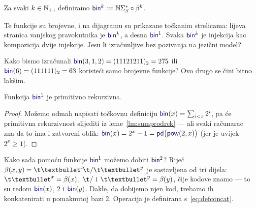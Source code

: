 \begin{definicija}[{name=[binarno kodiranje --- prateća funkcija binarne reprezentacije]}]\label{def:bink}
Za svaki $k\in{\mathbb N}_+$, definiramo $\f{bin}^k:=\N\Sigma_\beta^*\circ\beta^k$.
\end{definicija}

Te funkcije su brojevne, i na dijagramu su prikazane točkanim strelicama: lijeva stranica vanjskog pravokutnika je $\f{bin}^k$, a desna $\f{bin}^1$. Svaka $\f{bin}^k$ je injekcija kao kompozicija dvije injekcije. Jesu li izračunljive bez pozivanja na jezični model? %

Kako bismo izračunali $\f{bin}(3,1,2)=(11121211)_2=275$ ili $\f{bin}(6)=(111111)_2=63$ koristeći samo brojevne funkcije? Ovo drugo se čini bitno lakšim.

\begin{lema}[{name=[primitivna rekurzivnost jednomjesnog binarnog kodiranja]}]\label{lm:bin1prn}
Funkcija $\f{bin}^1$\! je primitivno rekurzivna.
\end{lema}
\begin{proof}
Možemo odmah napisati točkovnu definiciju $\f{bin}(x)=\sum_{i<x}2^i$, pa će primitivna rekurzivnost slijediti iz leme~\ref{lm:sumprodrek} --- ali svaki računarac zna da to ima i zatvoreni oblik:
$\f{bin}(x)=2^x-1=\f{pd}\bigl(\f{pow}(2,x)\bigr)$ (jer je uvijek $2^x\ge 1$).
\end{proof}

Kako sada pomoću funkcije $\f{bin}^1$ možemo dobiti $\f{bin}^2$? Riječ $\beta(x,y)=\t\textbullet^x\!\t/\t\textbullet^y$ je sastavljena od tri dijela: $\t\textbullet^x=\beta(x)$, $\t/$ i $\t\textbullet^y=\beta(y)$, čije kodove znamo --- to su redom $\f{bin}(x)$, $2$ i $\f{bin}(y)$. Dakle, da dobijemo njen kod, trebamo ih konkatenirati u pomaknutoj bazi $2$. Operacija je definirana s~\eqref{eq:defconcat}.

